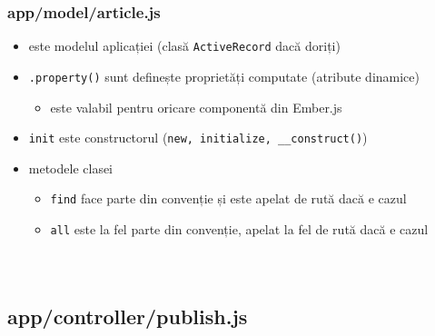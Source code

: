 \documentclass[compress]{beamer}
\begin{document}
\begin{frame}

\frametitle{app/model/article.js}

\begin{itemize}[<+->]
  \item este modelul aplicației (clasă \texttt{ActiveRecord} dacă doriți)
  \item \texttt{.property()} sunt definește proprietăți computate (atribute dinamice)
  \begin{itemize}[<+->]
    \item este valabil pentru oricare componentă din Ember.js
  \end{itemize}
  \item \texttt{init} este constructorul (\texttt{new, initialize, \_\_construct()})
  \item metodele clasei
  \begin{itemize}[<+->]
    \item \texttt{find} face parte din convenție și este apelat de rută dacă e cazul
    \item \texttt{all} este la fel parte din convenție, apelat la fel de rută dacă e cazul
  \end{itemize}
\end{itemize}

\begin{columns}
\begin{column}{0.5\textwidth}
\inputminted[fontsize=\tiny,gobble=2,linenos=true,firstline=6,lastline=20]{javascript}{code/js/app/model/article.js}
\end{column}
\begin{column}{0.5\textwidth}
\inputminted[fontsize=\tiny,gobble=2,linenos=true,firstline=30,lastline=41,firstnumber=24]{javascript}{code/js/app/model/article.js}
\end{column}
\end{columns}

\end{frame}

\subsection{app/controller/publish.js}
\end{document}
